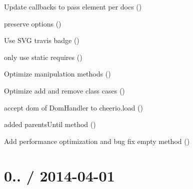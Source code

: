 \begin{DoxyItemize}
\item Update callbacks to pass element per docs ()
\item preserve options ()
\item Use S\+VG travis badge ()
\item only use static requires ()
\item Optimize manipulation methods ()
\item Optimize add and remove class cases ()
\item accept dom of Dom\+Handler to cheerio.\+load ()
\item added parents\+Until method ()
\item Add performance optimization and bug fix {\ttfamily empty} method ()
\end{DoxyItemize}

\section*{0.. / 2014-\/04-\/01 }


